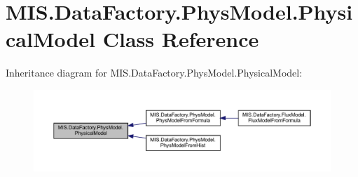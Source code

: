 \hypertarget{classMIS_1_1DataFactory_1_1PhysModel_1_1PhysicalModel}{}\section{M\+I\+S.\+Data\+Factory.\+Phys\+Model.\+Physical\+Model Class Reference}
\label{classMIS_1_1DataFactory_1_1PhysModel_1_1PhysicalModel}


Inheritance diagram for M\+I\+S.\+Data\+Factory.\+Phys\+Model.\+Physical\+Model\+:
\nopagebreak
\begin{figure}[H]
\begin{center}
\leavevmode
\includegraphics[width=350pt]{classMIS_1_1DataFactory_1_1PhysModel_1_1PhysicalModel__inherit__graph}
\end{center}
\end{figure}
